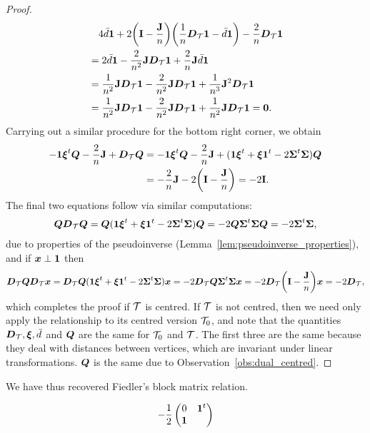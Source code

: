\begin{proof}
\begin{align*}
	&\quad  4\bar{d}\vb{1} +2\bigg(\vb{I}-\frac{\vb{J}}{n}\bigg)\bigg(\frac{1}{n}\vb*{D}_{\mathcal{T}}\vb{1}-\bar{d}\vb{1}\bigg)  -\frac{2}{n}\vb*{D}_{\mathcal{T}}\vb{1} \\
	&= 2\bar{d}\vb{1} -  \frac{2}{n^2}\vb{J}\vb*{D}_{\mathcal{T}}\vb{1} + \frac{2}{n}\vb{J}\bar{d}\vb{1} \\
	&=\frac{1}{n^2}\vb{J}\vb*{D}_{\mathcal{T}}\vb{1} -  \frac{2}{n^2}\vb{J}\vb*{D}_{\mathcal{T}}\vb{1} + \frac{1}{n^3}\vb{J}^2\vb*{D}_{\mathcal{T}}\vb{1} \\
	&= \frac{1}{n^2}\vb{J}\vb*{D}_{\mathcal{T}}\vb{1} -  \frac{2}{n^2}\vb{J}\vb*{D}_{\mathcal{T}}\vb{1} + \frac{1}{n^2}\vb{J}\vb*{D}_{\mathcal{T}}\vb{1}=\vb{0}.
	\end{align*}
	Carrying out a similar  procedure for  the  bottom right corner, we  obtain  
	\begin{align*}
	-\vb{1}\vb*{\xi}^t\vb*{Q}-\frac{2}{n}\vb{J}+\vb*{D}_{\mathcal{T}}\vb*{Q} &= -\vb{1}\vb*{\xi}^t\vb*{Q}-\frac{2}{n}\vb{J}  + (\vb{1}\vb*{\xi}^t+\vb*{\xi}\vb{1}^t -2\boldsymbol{\Sigma}^t\boldsymbol{\Sigma})\vb*{Q} \\
	&= -\frac{2}{n}\vb{J}-2\bigg(\vb{I}-\frac{\vb{J}}{n}\bigg) = -2\vb{I}.
	\end{align*}
	The  final two equations follow via similar computations: 
	\begin{align*}
	\vb*{Q}\vb*{D}_{\mathcal{T}}\vb*{Q} = \vb*{Q}(\vb{1}\vb*{\xi}^t+\vb*{\xi}\vb{1}^t-2\boldsymbol{\Sigma}^t\boldsymbol{\Sigma})\vb*{Q} = -2\vb*{Q}\boldsymbol{\Sigma}^t\boldsymbol{\Sigma}\vb*{Q} = -2\boldsymbol{\Sigma}^t\boldsymbol{\Sigma},
	\end{align*}
	due to properties of the pseudoinverse (Lemma~\ref{lem:pseudoinverse_properties}), and if $\vb*{x}\perp\vb{1}$ then 
	\begin{align*}
	\vb*{D}_{\mathcal{T}} \vb*{Q}\vb*{D}_{\mathcal{T}} \vb*{x} = \vb*{D}_{\mathcal{T}} \vb*{Q}(\vb{1}\vb*{\xi}^t  +\vb*{\xi}\vb{1}^t - 2\boldsymbol{\Sigma}^t\boldsymbol{\Sigma})\vb*{x} = -2\vb*{D}_{\mathcal{T}}\vb*{Q} \boldsymbol{\Sigma}^t\boldsymbol{\Sigma}\vb*{x} = -2\vb*{D}_{\mathcal{T}}\bigg(\vb{I}-\frac{\vb{J}}{n}\bigg) \vb*{x} = -2\vb*{D}_{\mathcal{T}},
	\end{align*}
	which completes the proof if $\mathcal{T}$ is centred. If $\mathcal{T}$  is not centred, then we need only apply the relationship to its centred  version $\mathcal{T}_0$, and note  that the quantities $\vb*{D}_{\mathcal{T}}, \vb*{\xi},\bar{d}$ and $\vb*{Q}$ are the same for $\mathcal{T}_0$ and $\mathcal{T}$. The first three are the same because they deal with distances between vertices, which are invariant under linear transformations. $\vb*{Q}$ is the  same due to  Observation~\ref{obs:dual_centred}. 
\end{proof}

\begin{remark}
	We have thus  recovered Fiedler's block matrix relation.  
\end{remark}


\begin{corollary}
	\begin{equation*}
	-\frac{1}{2}\begin{pmatrix}
	0 &  \vb{1}^t \\
	\vb{1} & 
	\end{pmatrix}
	\end{equation*}
\end{corollary}

